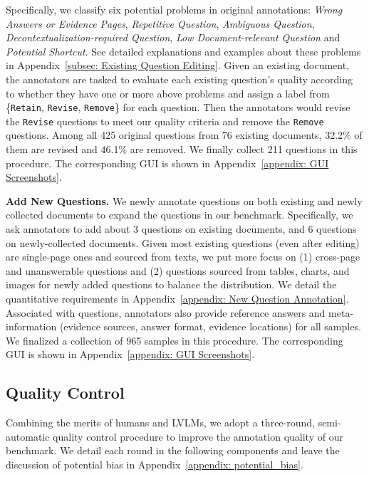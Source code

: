 Specifically, we classify six potential problems in original annotations: \textit{Wrong Answers or Evidence Pages}, \textit{Repetitive Question}, \textit{Ambiguous Question}, \textit{Decontextualization-required Question}, \textit{Low Document-relevant Question} and \textit{Potential Shortcut}. See detailed explanations and examples about these problems in Appendix~\ref{subsec: Existing Question Editing}. Given an existing document, the annotators are tasked to evaluate each existing question's quality according to whether they have one or more above problems and assign a label from \{\texttt{Retain}, \texttt{Revise}, \texttt{Remove}\} for each question. Then the annotators would revise the \texttt{Revise} questions to meet our quality criteria and remove the \texttt{Remove} questions. 
Among all 425 original questions from 76 existing documents, 32.2\% of them are revised and 46.1\% are removed. We finally collect 211 questions in this procedure. The corresponding GUI is shown in Appendix~\ref{appendix: GUI Screenshots}.


\noindent \textbf{Add New Questions.} 
We newly annotate questions on both existing and newly collected documents to expand the questions in our benchmark. 
Specifically, we ask annotators to add about 3 questions on existing documents, and 6 questions on newly-collected documents. Given most existing questions (even after editing) are single-page ones and sourced from texts, we put more focus on (1) cross-page and unanswerable questions and (2) questions sourced from tables, charts, and images for newly added questions to balance the distribution. We detail the quantitative requirements in Appendix~\ref{appendix: New Question Annotation}. Associated with questions, annotators also provide reference answers and meta-information (\ie evidence sources, answer format, evidence locations) for all samples. We finalized a collection of 965 samples in this procedure. The corresponding GUI is shown in Appendix~\ref{appendix: GUI Screenshots}.

\subsection{Quality Control}
\label{subsec: quality control}

Combining the merits of humans and LVLMs, we adopt a three-round, semi-automatic quality control procedure to improve the annotation quality of our benchmark. We detail each round in the following components and leave the discussion of potential bias in Appendix~\ref{appendix: potential_bias}.

